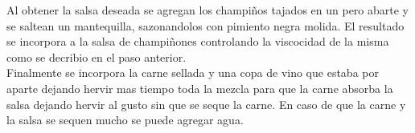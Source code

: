 Al obtener la salsa deseada se agregan los champiños tajados en un pero abarte y se saltean un mantequilla, sazonandolos con pimiento negra molida. El resultado se incorpora a la salsa de champiñones controlando la viscocidad de la misma como se decribio en el paso anterior.\\

Finalmente se incorpora la carne sellada y una copa de vino que estaba por aparte dejando hervir mas tiempo toda la mezcla para que la carne absorba la salsa dejando hervir al gusto sin que se seque la carne. En caso de que la carne y la salsa se sequen mucho se puede agregar agua.

